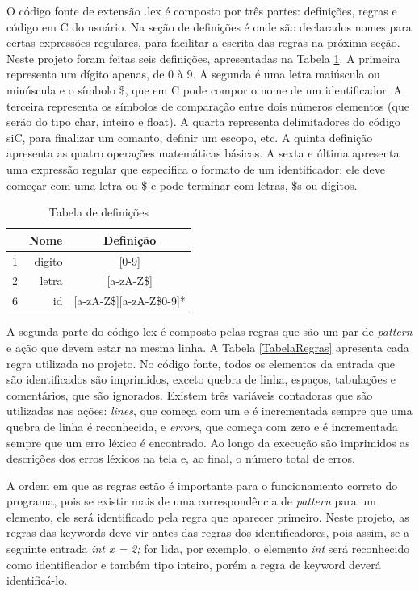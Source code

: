 \documentclass[12pt]{article}
\begin{document}
\indent O código fonte de extensão .lex é composto por três partes: definições, regras e código em C do usuário. Na seção de definições é onde são declarados nomes para certas expressões regulares, para facilitar a escrita das regras na próxima seção. Neste projeto foram feitas seis definições, apresentadas na Tabela \ref{TabelaDef}. A primeira representa um dígito apenas, de 0 à 9. A segunda é uma letra maiúscula ou minúscula e o símbolo \$, que em C pode compor o nome de um identificador. A terceira representa os símbolos de comparação entre dois números elementos (que serão do tipo char, inteiro e float). A quarta representa delimitadores do código siC, para finalizar um comanto, definir um escopo, etc. A quinta definição apresenta as quatro operações matemáticas básicas. A sexta e última apresenta uma expressão regular que especifica o formato de um identificador: ele deve começar com uma letra ou \$ e pode terminar com letras, \$s ou dígitos.

\begin{table}
 \centering
 \begin{tabular}{| c || r  c |}
  \hline
   & Nome & Definição \\
  \hline  \hline
  1 & digito & [0-9] \\
  \hline
  2 & letra & [a-zA-Z\$] \\
  \hline
  6 & id & [a-zA-Z\$][a-zA-Z\$0-9]* \\
  \hline
\end{tabular}
\caption{Tabela de definições}
\label{TabelaDef}
\end{table}
 
\indent A segunda parte do código lex é composto pelas regras que são um par de \textit{pattern} e ação que devem estar na mesma linha. A Tabela \ref{TabelaRegras} apresenta cada regra utilizada no projeto. No código fonte, todos os elementos da entrada que são identificados são imprimidos, exceto quebra de linha, espaços, tabulações e comentários, que são ignorados. Existem três variáveis contadoras que são utilizadas nas ações: \textit{lines}, que começa com um e é incrementada sempre que uma quebra de linha é reconhecida, e \textit{errors}, que começa com zero e é incrementada sempre que um erro léxico é encontrado. Ao longo da execução são imprimidos as descrições dos erros léxicos na tela e, ao final, o número total de erros.

\indent A ordem em que as regras estão é importante para o funcionamento correto do programa, pois se existir mais de uma correspondência de \textit{pattern} para um elemento, ele será identificado pela regra que aparecer primeiro. Neste projeto, as regras das keywords deve vir antes das regras dos identificadores, pois assim, se a seguinte entrada \textit{int x = 2;} for lida, por exemplo, o elemento \textit{int} será reconhecido como identificador e também tipo inteiro, porém a regra de keyword deverá identificá-lo.
\end{document}
